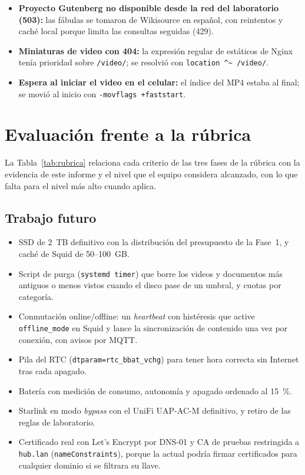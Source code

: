 \documentclass[conference]{IEEEtran}
\begin{document}
\begin{itemize}
\item \textbf{Proyecto Gutenberg no disponible desde la red del laboratorio (503):} las fábulas se tomaron de Wikisource en español, con reintentos y caché local porque limita las consultas seguidas (429).
\item \textbf{Miniaturas de video con 404:} la expresión regular de estáticos de Nginx tenía prioridad sobre \texttt{/video/}; se resolvió con \texttt{location \textasciicircum\textasciitilde{} /video/}.
\item \textbf{Espera al iniciar el video en el celular:} el índice del MP4 estaba al final; se movió al inicio con \texttt{-movflags +faststart}.
\end{itemize}

\section{Evaluación frente a la rúbrica}
La Tabla~\ref{tab:rubrica} relaciona cada criterio de las tres fases de la rúbrica con la evidencia de este informe y el nivel que el equipo considera alcanzado, con lo que falta para el nivel más alto cuando aplica.


\subsection{Trabajo futuro}
\begin{itemize}
\item SSD de 2~TB definitivo con la distribución del presupuesto de la Fase~1, y caché de Squid de 50--100~GB.
\item Script de purga (\texttt{systemd timer}) que borre los videos y documentos más antiguos o menos vistos cuando el disco pase de un umbral, y cuotas por categoría.
\item Conmutación online/offline: un \textit{heartbeat} con histéresis que active \texttt{offline\_mode} en Squid y lance la sincronización de contenido una vez por conexión, con avisos por MQTT.
\item Pila del RTC (\texttt{dtparam=rtc\_bbat\_vchg}) para tener hora correcta sin Internet tras cada apagado.
\item Batería con medición de consumo, autonomía y apagado ordenado al 15~\%.
\item Starlink en modo \textit{bypass} con el UniFi UAP-AC-M definitivo, y retiro de las reglas de laboratorio.
\item Certificado real con Let's Encrypt por DNS-01 y CA de pruebas restringida a \texttt{hub.lan} (\texttt{nameConstraints}), porque la actual podría firmar certificados para cualquier dominio si se filtrara su llave.
\end{itemize}
\end{document}
